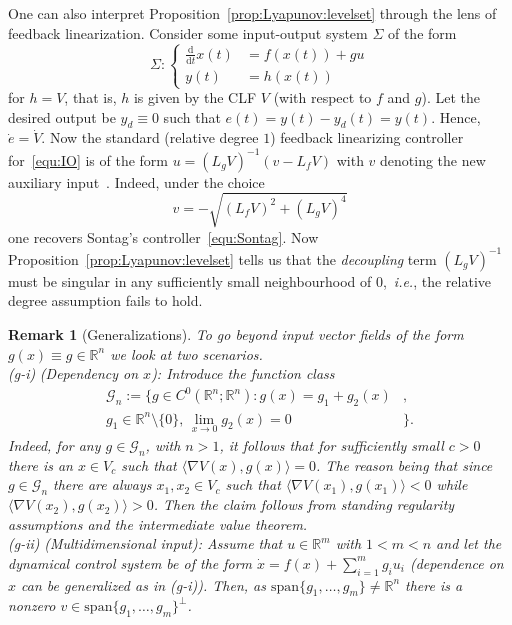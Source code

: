 \documentclass[letterpaper, 10 pt, conference]{ieeeconf}  %
\theoremstyle{mystyle}
\newtheorem{remark}[theorem]{Remark}
\begin{document}
One can also interpret Proposition~\ref{prop:Lyapunov:levelset} through the lens of feedback linearization.
Consider some input-output system $\Sigma$ of the form
\begin{equation}
\label{equ:IO}
\Sigma: \left\{     \begin{aligned}
\frac{\mathrm{d}}{\mathrm{d}t}{x(t)} &= f(x(t))+g u\\
y(t) &= h(x(t))
    \end{aligned}\right.
\end{equation}
for $h=V$, that is, $h$ is given by the CLF $V$ (with respect to $f$ and $g$). Let the desired output be $y_d\equiv 0$ such that $e(t)=y(t)-y_d(t)=y(t)$. Hence, $\dot{e}=\dot{V}$. Now the standard (relative degree $1$) feedback linearizing controller for~\eqref{equ:IO} is of the form $u=(L_gV)^{-1}(v-L_fV)$ with $v$ denoting the new auxiliary input~\cite{ref:isidori1985nonlinear,nonlin}. Indeed, under the choice
\begin{equation*}
    v=-\sqrt{(L_fV)^2+(L_gV)^4}
\end{equation*}
one recovers Sontag's controller~\eqref{equ:Sontag}. Now Proposition~\ref{prop:Lyapunov:levelset} tells us that the \textit{decoupling} term $(L_gV)^{-1}$ must be singular in any sufficiently small neighbourhood of $0$,~\textit{i.e.}, the relative degree assumption fails to hold.  

\begin{remark}[Generalizations]
\label{rem:gen}
To go beyond input vector fields of the form $g(x)\equiv g\in \mathbb{R}^n$ we look at two scenarios. \\
(g-i)\,\,(Dependency on $x$): Introduce the function class 
\begin{align*}
    \mathscr{G}_n:=\{g\in C^{0}(\mathbb{R}^n;\mathbb{R}^n):g(x)=g_1+g_2(x)&,\\
    g_1\in \mathbb{R}^n\setminus\{0\},\,\lim_{x\to 0}g_2(x)=0&\}. 
\end{align*}
Indeed, for any $g\in \mathscr{G}_{n}$, with $n>1$, it follows that for sufficiently small $c>0$ there is an $x\in V_c$ such that $\langle \nabla V(x),g(x)\rangle=0$. The reason being that since $g\in \mathscr{G}_{n}$ there are always $x_1,x_2\in V_c$ such that $\langle \nabla V(x_1),g(x_1)\rangle<0$ while $\langle \nabla V(x_2),g(x_2)\rangle>0$. Then the claim follows from standing regularity assumptions and the intermediate value theorem. \\
    (g-ii)\,\,(Multidimensional input): Assume that $u\in \mathbb{R}^m$ with $1<m<n$ and let the dynamical control system be of the form $\dot{x}=f(x)+\sum^m_{i=1}g_i u_i$ (dependence on $x$ can be generalized as in (g-i)). Then, as $\mathrm{span}\{g_1,\dots,g_m\}\neq \mathbb{R}^n$ there is a nonzero $v\in \mathrm{span}\{g_1,\dots,g_m\}^{\perp}$.    
\end{remark}
\end{document}
